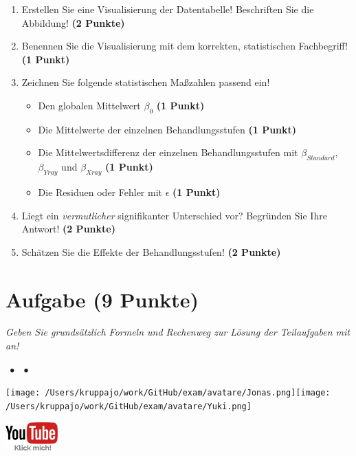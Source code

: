 \documentclass[a4paper, 9pt]{scrartcl}\usepackage[]{graphicx}\usepackage[]{xcolor}
\begin{document}
\begin{enumerate}
\item Erstellen  Sie  eine  Visualisierung  der  Datentabelle! Beschriften  Sie  die  Abbildung! \textbf{(2 Punkte)}
\item Benennen Sie die Visualisierung mit dem korrekten, statistischen Fachbegriff! \textbf{(1 Punkt)}
\item Zeichnen Sie folgende statistischen Maßzahlen passend ein! 
  \begin{itemize}
  \item Den globalen Mittelwert $\beta_0$ \textbf{(1 Punkt)}
  \item Die Mittelwerte der einzelnen Behandlungsstufen \textbf{(1 Punkt)}
  \item Die Mittelwertsdifferenz der einzelnen Behandlungsstufen mit $\beta_{Standard}$, $\beta_{Yray}$ und $\beta_{Xray}$ \textbf{(1 Punkt)}
  \item Die Residuen oder Fehler mit $\epsilon$ \textbf{(1 Punkt)}
  \end{itemize}
\item Liegt ein \textit{vermutlicher} signifikanter Unterschied vor? Begründen Sie Ihre Antwort! \textbf{(2 Punkte)}
\item Schätzen Sie die Effekte der Behandlungsstufen! \textbf{(2 Punkte)}
\end{enumerate}
 
\clearpage

\section{Aufgabe \hfill (9 Punkte)}

\textit{Geben Sie grundsätzlich Formeln und Rechenweg zur Lösung der Teilaufgaben mit an!} \\[1Ex]
 

 
\ifcollection
\begin{flushright}
\tiny\vspace{-3Ex}
\textbf{\examinhaltstart}
\exammodulemathstat $\;\bullet$
\exammodulestat $\;\bullet$
\exammodulestatbbv 
\vspace{-4Ex}
\end{flushright}
\begin{minipage}[t]{0.5\textwidth}
\texttt{[image: /Users/kruppajo/work/GitHub/exam/avatare/Jonas.png]}\hspace{-4mm}\texttt{[image: /Users/kruppajo/work/GitHub/exam/avatare/Yuki.png]}
\end{minipage}
\begin{minipage}[t]{0.5\textwidth}
\hfill
\href{https://youtu.be/IhecxMcCENY}{\includegraphics[width = 2cm]{img/youtube}}
\end{minipage}
\fi
\end{document}
